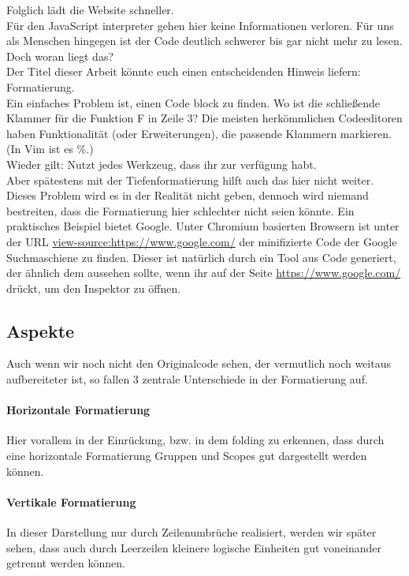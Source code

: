 		Folglich lädt die Website schneller.\\
		Für den JavaScript interpreter gehen hier keine Informationen verloren.
		Für uns als Menschen hingegen ist der Code deutlich schwerer bis gar nicht mehr zu lesen.\\
		Doch woran liegt das?\\
		Der Titel dieser Arbeit könnte euch einen entscheidenden Hinweis liefern: Formatierung.\\
		Ein einfaches Problem ist, einen Code block zu finden.
		Wo ist die schließende Klammer für die Funktion F in Zeile 3?
		Die meisten herkömmlichen Codeeditoren haben Funktionalität (oder Erweiterungen), die passende Klammern markieren. (In Vim ist es \%.)\\
		Wieder gilt: Nutzt jedes Werkzeug, dass ihr zur verfügung habt.\\
		Aber spätestens mit der Tiefenformatierung hilft auch das hier nicht weiter.\\
		Dieses Problem wird es in der Realität nicht geben, dennoch wird niemand bestreiten, dass die Formatierung hier schlechter nicht seien könnte.
		Ein praktisches Beispiel bietet Google. Unter Chromium basierten Browsern ist unter der URL \href{view-source:https://www.google.com/}{view-source:https://www.google.com/} der minifizierte Code der Google Suchmaschiene zu finden.
		Dieser ist natürlich durch ein Tool aus  Code generiert, der ähnlich dem aussehen sollte, wenn ihr auf der Seite \href{https://www.google.com/}{https://www.google.com/}  drückt, um den Inspektor zu öffnen.

	\subsection{Aspekte}
		Auch wenn wir noch nicht den Originalcode sehen, der vermutlich noch weitaus aufbereiteter ist, so fallen 3 zentrale Unterschiede in der Formatierung auf.
		\paragraph{Horizontale Formatierung}
			Hier vorallem in der Einrückung, bzw. in dem folding zu erkennen, dass durch eine horizontale Formatierung Gruppen und Scopes gut dargestellt werden können.
		\paragraph{Vertikale Formatierung}
			In dieser Darstellung nur durch Zeilenumbrüche realisiert, werden wir später sehen, dass auch durch Leerzeilen kleinere logische Einheiten gut voneinander getrennt werden können.
